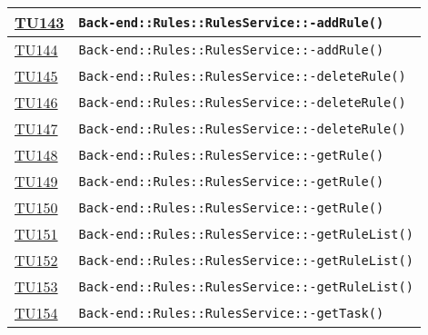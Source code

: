 \begin{longtable}{|>{\centering}m{1cm}|m{12cm}<{\centering}|}
\hyperlink{TU143}{TU143} & \texttt{Back-end::Rules::RulesService::-\linebreak addRule()}\\ \hline

\hyperlink{TU144}{TU144} & \texttt{Back-end::Rules::RulesService::-\linebreak addRule()}\\ \hline

\hyperlink{TU145}{TU145} & \texttt{Back-end::Rules::RulesService::-\linebreak deleteRule()}\\ \hline

\hyperlink{TU146}{TU146} & \texttt{Back-end::Rules::RulesService::-\linebreak deleteRule()}\\ \hline

\hyperlink{TU147}{TU147} & \texttt{Back-end::Rules::RulesService::-\linebreak deleteRule()}\\ \hline

\hyperlink{TU148}{TU148} & \texttt{Back-end::Rules::RulesService::-\linebreak getRule()}\\ \hline

\hyperlink{TU149}{TU149} & \texttt{Back-end::Rules::RulesService::-\linebreak getRule()}\\ \hline

\hyperlink{TU150}{TU150} & \texttt{Back-end::Rules::RulesService::-\linebreak getRule()}\\ \hline

\hyperlink{TU151}{TU151} & \texttt{Back-end::Rules::RulesService::-\linebreak getRuleList()}\\ \hline

\hyperlink{TU152}{TU152} & \texttt{Back-end::Rules::RulesService::-\linebreak getRuleList()}\\ \hline

\hyperlink{TU153}{TU153} & \texttt{Back-end::Rules::RulesService::-\linebreak getRuleList()}\\ \hline

\hyperlink{TU154}{TU154} & \texttt{Back-end::Rules::RulesService::-\linebreak getTask()}\\ \hline


\end{longtable}

